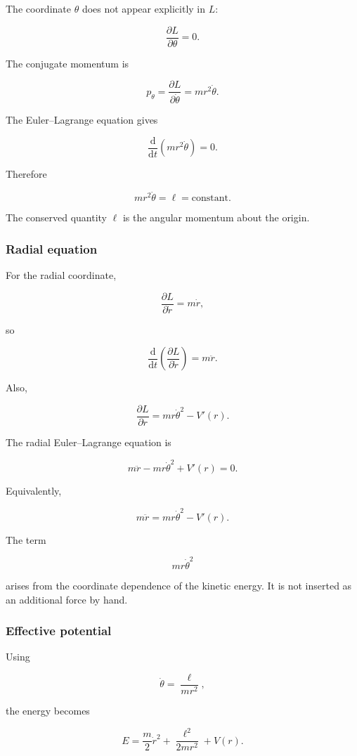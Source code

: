The coordinate \(\theta\) does not appear explicitly in \(L\):

\[
\frac{\partial L}{\partial\theta}=0.
\]

The conjugate momentum is

\[
p_{\theta}
=
\frac{\partial L}{\partial\dot\theta}
=
mr^{2}\dot\theta.
\]

The Euler--Lagrange equation gives

\[
\frac{\mathrm{d}}{\mathrm{d}t}
\left(mr^{2}\dot\theta\right)
=0.
\]

Therefore

\[
\boxed{
mr^{2}\dot\theta
=\ell
=\text{constant}
}.
\]

The conserved quantity \(\ell\) is the angular momentum about the origin.

\subsubsection{Radial equation}

For the radial coordinate,

\[
\frac{\partial L}{\partial\dot r}
=
m\dot r,
\]

so

\[
\frac{\mathrm{d}}{\mathrm{d}t}
\left(
\frac{\partial L}{\partial\dot r}
\right)
=
m\ddot r.
\]

Also,

\[
\frac{\partial L}{\partial r}
=
mr\dot\theta^{2}-V'(r).
\]

The radial Euler--Lagrange equation is

\[
m\ddot r
-
mr\dot\theta^{2}
+
V'(r)
=0.
\]

Equivalently,

\[
\boxed{
m\ddot r
=
mr\dot\theta^{2}
-
V'(r)
}.
\]

The term

\[
mr\dot\theta^{2}
\]

arises from the coordinate dependence of the kinetic energy. It is not inserted as an additional force by hand.

\subsubsection{Effective potential}

Using

\[
\dot\theta
=
\frac{\ell}{mr^{2}},
\]

the energy becomes

\[
E
=
\frac{m}{2}\dot r^{2}
+
\frac{\ell^{2}}{2mr^{2}}
+
V(r).
\]

